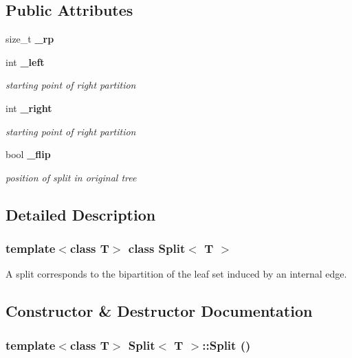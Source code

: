 \subsection*{Public Attributes}
\begin{CompactItemize}
\item 
size\_\-t {\bf \_\-rp}
\item 
int {\bf \_\-left}
\begin{CompactList}\small\item\em starting point of right partition \item\end{CompactList}\item 
int {\bf \_\-right}
\begin{CompactList}\small\item\em starting point of right partition \item\end{CompactList}\item 
bool {\bf \_\-flip}
\begin{CompactList}\small\item\em position of split in original tree \item\end{CompactList}\end{CompactItemize}


\subsection{Detailed Description}
\subsubsection*{template$<$class T$>$ class Split$<$ T $>$}

A split corresponds to the bipartition of the leaf set induced by an internal edge. 



\subsection{Constructor \& Destructor Documentation}
\subsubsection{\setlength{\rightskip}{0pt plus 5cm}template$<$class T$>$ {\bf Split}$<$ T $>$::{\bf Split} ()}\label{classSplit_a0}


